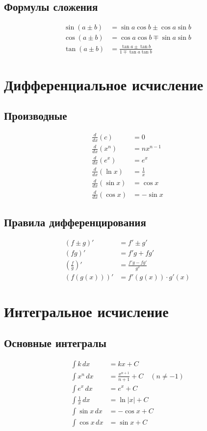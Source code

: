 \documentclass[10pt,landscape,a4paper]{article}
\begin{document}
\begin{multicols}{2}
\subsection{Формулы сложения}
\begin{align}
    \sin(a \pm b) &= \sin a \cos b \pm \cos a \sin b \\
    \cos(a \pm b) &= \cos a \cos b \mp \sin a \sin b \\
    \tan(a \pm b) &= \frac{\tan a \pm \tan b}{1 \mp \tan a \tan b}
\end{align}

\section{Дифференциальное исчисление}

\subsection{Производные}
\begin{align}
    \frac{d}{dx}(c) &= 0 \\
    \frac{d}{dx}(x^n) &= nx^{n-1} \\
    \frac{d}{dx}(e^x) &= e^x \\
    \frac{d}{dx}(\ln x) &= \frac{1}{x} \\
    \frac{d}{dx}(\sin x) &= \cos x \\
    \frac{d}{dx}(\cos x) &= -\sin x
\end{align}

\subsection{Правила дифференцирования}
\begin{align}
    (f \pm g)' &= f' \pm g' \\
    (fg)' &= f'g + fg' \\
    \left(\frac{f}{g}\right)' &= \frac{f'g - fg'}{g^2} \\
    (f(g(x)))' &= f'(g(x)) \cdot g'(x)
\end{align}

\section{Интегральное исчисление}

\subsection{Основные интегралы}
\begin{align}
    \int k \, dx &= kx + C \\
    \int x^n \, dx &= \frac{x^{n+1}}{n+1} + C \quad (n \neq -1) \\
    \int e^x \, dx &= e^x + C \\
    \int \frac{1}{x} \, dx &= \ln|x| + C \\
    \int \sin x \, dx &= -\cos x + C \\
    \int \cos x \, dx &= \sin x + C
\end{align}


\end{multicols}
\end{document}

